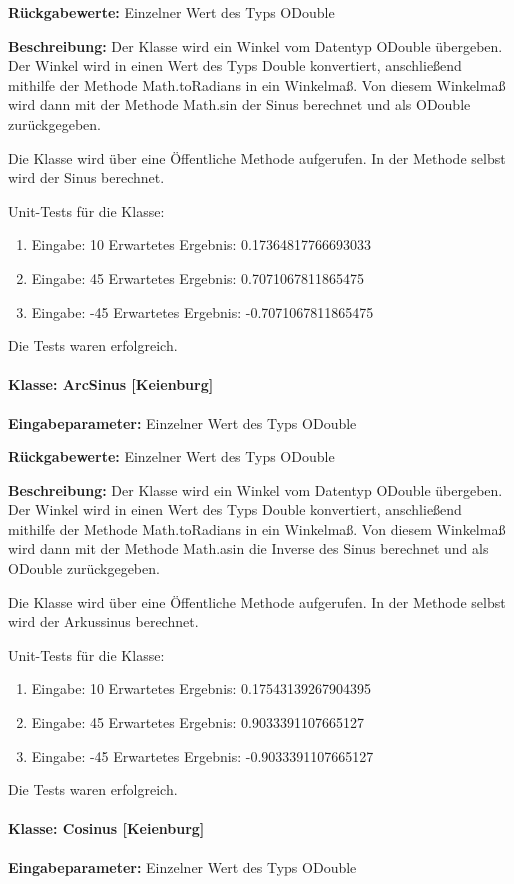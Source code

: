 \textbf{Rückgabewerte: } Einzelner Wert des Typs ODouble

\textbf{Beschreibung: } Der Klasse wird ein Winkel vom Datentyp ODouble übergeben. Der Winkel wird in einen Wert des Typs Double konvertiert, anschließend mithilfe der Methode Math.toRadians in ein Winkelmaß. Von diesem Winkelmaß wird dann mit der Methode Math.sin der Sinus berechnet und als ODouble zurückgegeben.  

Die Klasse wird über eine Öffentliche Methode aufgerufen. In der Methode selbst wird der Sinus berechnet. 

Unit-Tests für die Klasse: 	
\begin{enumerate}
	\item Eingabe:  10 Erwartetes Ergebnis: 0.17364817766693033
	\item Eingabe:  45 Erwartetes Ergebnis: 0.7071067811865475
	\item Eingabe: -45 Erwartetes Ergebnis: -0.7071067811865475
\end{enumerate}
Die Tests waren erfolgreich.

\paragraph{Klasse: ArcSinus [Keienburg]}
\textbf{Eingabeparameter: } Einzelner Wert des Typs ODouble

\textbf{Rückgabewerte: } Einzelner Wert des Typs ODouble

\textbf{Beschreibung: } Der Klasse wird ein Winkel vom Datentyp ODouble übergeben. Der Winkel wird in einen Wert des Typs Double konvertiert, anschließend mithilfe der Methode Math.toRadians in ein Winkelmaß. Von diesem Winkelmaß wird dann mit der Methode Math.asin die Inverse des Sinus berechnet und als ODouble zurückgegeben.  

Die Klasse wird über eine Öffentliche Methode aufgerufen. In der Methode selbst wird der Arkussinus berechnet. 

Unit-Tests für die Klasse: 	
\begin{enumerate}
	\item Eingabe:  10 Erwartetes Ergebnis: 0.17543139267904395
	\item Eingabe:  45 Erwartetes Ergebnis: 0.9033391107665127
	\item Eingabe: -45 Erwartetes Ergebnis: -0.9033391107665127
\end{enumerate}
Die Tests waren erfolgreich.

\paragraph{Klasse: Cosinus [Keienburg]}
\textbf{Eingabeparameter: } Einzelner Wert des Typs ODouble
	
